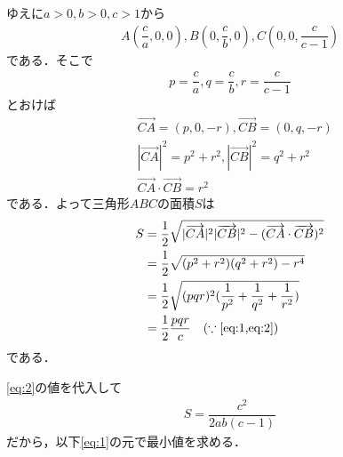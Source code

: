\documentclass[../../main.tex]{subfiles}
\begin{document}
ゆえに$a>0,b>0,c>1$から
\begin{align}
  A\left(\dfrac{c}{a},0,0\right),
  B\left(0,\dfrac{c}{b},0\right),
  C\left(0,0,\dfrac{c}{c-1}\right)
\end{align}
である．そこで
\begin{align}
  p=\dfrac{c}{a} , q=\dfrac{c}{b} , r=\dfrac{c}{c-1} \label{eq:2}
\end{align}
とおけば
\begin{align}
  &\overrightarrow{CA}=(p,0,-r), \overrightarrow{CB}=(0,q,-r) \\
  &|\overrightarrow{CA}|^2=p^2+r^2,
  |\overrightarrow{CB}|^2=q^2+r^2 \\
  &\overrightarrow{CA}\cdot\overrightarrow{CB}=r^2
\end{align}
である．よって三角形$ABC$の面積$S$は
\begin{align}
  S
  &=\dfrac{1}{2}\sqrt{|\overrightarrow{CA}|^2|\overrightarrow{CB}|^2-(\overrightarrow{CA}\cdot\overrightarrow{CB})^2} \\
  &=\dfrac{1}{2}\sqrt{(p^2+r^2)(q^2+r^2)-r^4} \\
  &=\dfrac{1}{2}\sqrt{(pqr)^2(\dfrac{1}{p^2}+\dfrac{1}{q^2}+\dfrac{1}{r^2})} \\
  &=\dfrac{1}{2}\dfrac{pqr}{c} \quad (\because\text{\cref{eq:1,eq:2}}) \label{eq:3}
\end{align}
である．

\cref{eq:2}の値を代入して
\begin{align}
  S=\dfrac{c^2}{2ab(c-1)} \label{eq:4}
\end{align}
だから，以下\cref{eq:1}の元で最小値を求める．
\end{document}
